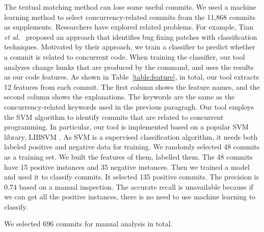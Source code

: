The textual matching method can lose some useful commits. We used a machine learning method to select concurrency-related commits from the 11,868 commits as supplements. Researchers have explored related problems. For example, Tian \emph{et al.}~\cite{tian2012identifying} proposed an approach that identifies bug fixing patches with classification techniques. Motivated by their approach, we train a classifier to predict whether a commit is related to concurrent code. When training the classifier, our tool analyzes change hunks that are produced by the  command, and uses the results as our code features. As shown in Table~\ref{table:feature}, in total, our tool extracts 12 features from each commit. The first column shows the feature names, and the second column shows the explanations. The keywords are the same as the concurrency-related keywords used in the previous paragragh. Our tool employs the SVM \cite{journals/ml/CortesV95} algorithm to identify commits that are related to concurrent programming. In particular, our tool is implemented based on a popular SVM library, LIBSVM \cite{libsvm}. As SVM is a supervised classification algorithm, it needs both labeled positive and negative data for training. We randomly selected 48 commits as a training set. We built the features of them, labelled them. The 48 commits have 15 positive instances and 35 negative instances. Then we trained a model and used it to classify commits. It selected 135 positive commits. The precision is 0.74 based on a manual inspection. The accurate recall is unavailable because if we can get all the positive instances, there is no need to use machine learning to classify.

We selected 696 commits for manual analysis in total.




